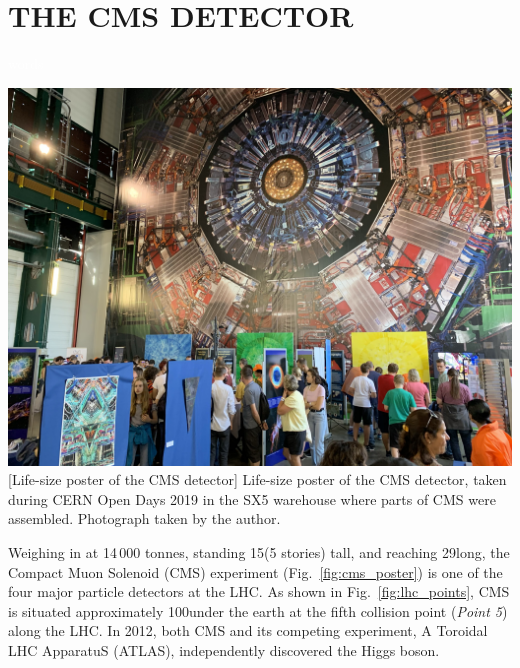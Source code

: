 \chapter{THE CMS DETECTOR} 
\label{ch:cms}
\textcolor{white}{words}  %
\begin{multiFigure}
    \centering
    \includegraphics[height=10cm]{figures/cms/cms_poster_SX5.jpg}
        [Life-size poster of the CMS detector]
        {Life-size poster of the CMS detector, taken during CERN Open Days 2019 in the SX5 warehouse where parts of CMS were assembled.
        Photograph taken by the author.}
    \label{fig:cms_poster}
\end{multiFigure}
Weighing in at 14\,000 tonnes, standing 15\meter (5 stories) tall, and reaching 29\meter long, the Compact Muon Solenoid (CMS) experiment (Fig.~\ref{fig:cms_poster}) is one of 
the four major particle detectors at the LHC.
As shown in Fig.~\ref{fig:lhc_points}, CMS is situated approximately 100\meter under the earth at the fifth collision point (\emph{Point 5}) along the LHC.
In 2012, both CMS and its competing experiment, A Toroidal LHC ApparatuS (ATLAS), independently discovered the Higgs boson.

